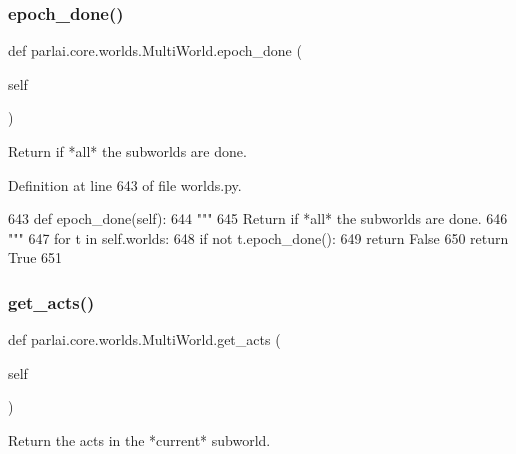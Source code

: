 \subsubsection{\texorpdfstring{epoch\+\_\+done()}{epoch\_done()}}
{\footnotesize\ttfamily def parlai.\+core.\+worlds.\+Multi\+World.\+epoch\+\_\+done (\begin{DoxyParamCaption}\item[{}]{self }\end{DoxyParamCaption})}

\begin{DoxyVerb}Return if *all* the subworlds are done.
\end{DoxyVerb}
 

Definition at line 643 of file worlds.\+py.


\begin{DoxyCode}
643     \textcolor{keyword}{def }epoch\_done(self):
644         \textcolor{stringliteral}{"""}
645 \textcolor{stringliteral}{        Return if *all* the subworlds are done.}
646 \textcolor{stringliteral}{        """}
647         \textcolor{keywordflow}{for} t \textcolor{keywordflow}{in} self.worlds:
648             \textcolor{keywordflow}{if} \textcolor{keywordflow}{not} t.epoch\_done():
649                 \textcolor{keywordflow}{return} \textcolor{keyword}{False}
650         \textcolor{keywordflow}{return} \textcolor{keyword}{True}
651 
\end{DoxyCode}
\mbox{\label{classparlai_1_1core_1_1worlds_1_1MultiWorld_a73074f333544de25b4e07ffc48819896}} 
\subsubsection{\texorpdfstring{get\+\_\+acts()}{get\_acts()}}
{\footnotesize\ttfamily def parlai.\+core.\+worlds.\+Multi\+World.\+get\+\_\+acts (\begin{DoxyParamCaption}\item[{}]{self }\end{DoxyParamCaption})}

\begin{DoxyVerb}Return the acts in the *current* subworld.
\end{DoxyVerb}
 


